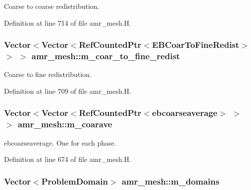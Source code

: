 Coarse to coarse redistribution. 



Definition at line 714 of file amr\+\_\+mesh.\+H.

\subsubsection[{\texorpdfstring{m\+\_\+coar\+\_\+to\+\_\+fine\+\_\+redist}{m_coar_to_fine_redist}}]{\setlength{\rightskip}{0pt plus 5cm}Vector$<$Vector$<$Ref\+Counted\+Ptr$<$E\+B\+Coar\+To\+Fine\+Redist$>$ $>$ $>$ amr\+\_\+mesh\+::m\+\_\+coar\+\_\+to\+\_\+fine\+\_\+redist\hspace{0.3cm}{\ttfamily [protected]}}\hypertarget{classamr__mesh_a195b44857b684c2273d3179a484e794f}{}\label{classamr__mesh_a195b44857b684c2273d3179a484e794f}


Coarse to fine redistribution. 



Definition at line 709 of file amr\+\_\+mesh.\+H.

\subsubsection[{\texorpdfstring{m\+\_\+coarave}{m_coarave}}]{\setlength{\rightskip}{0pt plus 5cm}Vector$<$Vector$<$Ref\+Counted\+Ptr$<${\bf ebcoarseaverage}$>$ $>$ $>$ amr\+\_\+mesh\+::m\+\_\+coarave\hspace{0.3cm}{\ttfamily [protected]}}\hypertarget{classamr__mesh_af8751335c6b5d0dbd665cad39ea487f5}{}\label{classamr__mesh_af8751335c6b5d0dbd665cad39ea487f5}


ebcoarseaverage. One for each phase. 



Definition at line 674 of file amr\+\_\+mesh.\+H.

\subsubsection[{\texorpdfstring{m\+\_\+domains}{m_domains}}]{\setlength{\rightskip}{0pt plus 5cm}Vector$<$Problem\+Domain$>$ amr\+\_\+mesh\+::m\+\_\+domains\hspace{0.3cm}{\ttfamily [protected]}}\hypertarget{classamr__mesh_a3eccd618a9a75f8eb824f38872a1b315}{}\label{classamr__mesh_a3eccd618a9a75f8eb824f38872a1b315}


